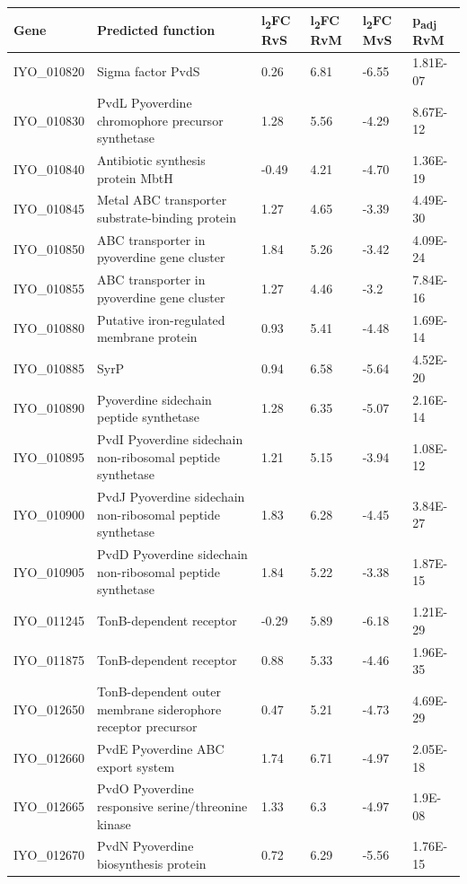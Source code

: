 \begin{table}[H]
\footnotesize
    \centering
    \begin{tabular}{p{1.8cm}p{7.5cm}p{0.8cm}p{0.8cm}p{0.8cm}p{1.5cm}}\toprule
Gene & Predicted function & l\textsubscript{2}FC RvS  & l\textsubscript{2}FC RvM & l\textsubscript{2}FC MvS & p\textsubscript{adj} RvM\\\midrule
IYO_010820 & Sigma factor PvdS & 0.26 & 6.81 & -6.55 & 1.81E-07 \\
IYO_010830 & PvdL Pyoverdine chromophore precursor synthetase & 1.28 & 5.56 & -4.29 & 8.67E-12\\
IYO_010840 & Antibiotic synthesis protein MbtH & -0.49 & 4.21 & -4.70 & 1.36E-19\\
IYO_010845 & Metal ABC transporter substrate-binding protein & 1.27 & 4.65 & -3.39 & 4.49E-30\\
IYO_010850 & ABC transporter in pyoverdine gene cluster  & 1.84 & 5.26 & -3.42 & 4.09E-24\\
IYO_010855 & ABC transporter in pyoverdine gene cluster & 1.27 & 4.46 & -3.2 & 7.84E-16 \\
IYO_010880 & Putative iron-regulated membrane protein & 0.93 & 5.41 & -4.48 & 1.69E-14\\
IYO_010885	& SyrP & 0.94 & 6.58 & -5.64 & 4.52E-20\\
IYO_010890 & Pyoverdine sidechain peptide synthetase & 1.28 & 6.35 &-5.07 &2.16E-14\\
IYO_010895 & PvdI Pyoverdine sidechain non-ribosomal peptide synthetase & 1.21 & 5.15 & -3.94 & 1.08E-12\\
IYO_010900 & PvdJ Pyoverdine sidechain non-ribosomal peptide synthetase & 1.83 & 6.28 & -4.45 & 3.84E-27\\
IYO_010905 & PvdD Pyoverdine sidechain non-ribosomal peptide synthetase & 1.84 & 5.22 & -3.38 & 1.87E-15 \\
IYO_011245 & TonB-dependent receptor & -0.29 & 5.89 & -6.18 & 1.21E-29\\ 
IYO_011875 & TonB-dependent receptor & 0.88 & 5.33 &-4.46 &	1.96E-35\\
IYO_012650 & TonB-dependent outer membrane siderophore receptor precursor & 0.47 & 5.21 & -4.73 & 4.69E-29\\
IYO_012660 & PvdE Pyoverdine ABC export system & 1.74 & 6.71 & -4.97 & 2.05E-18\\
IYO_012665 & PvdO Pyoverdine responsive serine/threonine kinase & 1.33 & 6.3 & -4.97 & 1.9E-08\\
IYO_012670 & PvdN Pyoverdine biosynthesis protein & 0.72 & 6.29 & -5.56 & 1.76E-15 \\

\end{tabular}
\end{table}
